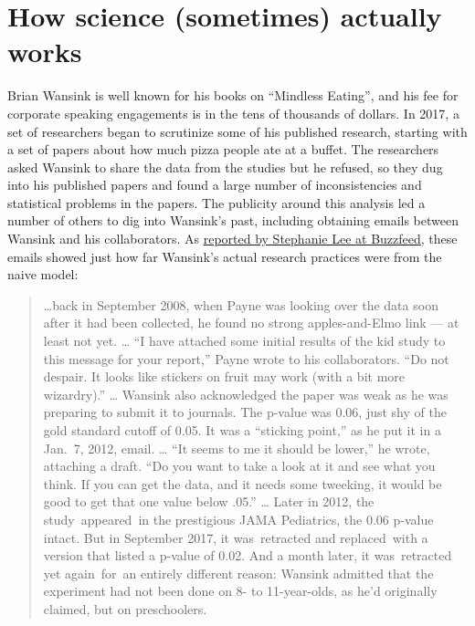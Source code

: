 \documentclass[12pt,]{book}
\theoremstyle{definition}
\theoremstyle{definition}
\theoremstyle{definition}
\theoremstyle{remark}
\begin{document}
\hypertarget{how-science-sometimes-actually-works}{%
\section{How science (sometimes) actually works}\label{how-science-sometimes-actually-works}}

Brian Wansink is well known for his books on ``Mindless Eating'', and his fee for corporate speaking engagements is in the tens of thousands of dollars. In 2017, a set of researchers began to scrutinize some of his published research, starting with a set of papers about how much pizza people ate at a buffet. The researchers asked Wansink to share the data from the studies but he refused, so they dug into his published papers and found a large number of inconsistencies and statistical problems in the papers. The publicity around this analysis led a number of others to dig into Wansink's past, including obtaining emails between Wansink and his collaborators. As \href{https://www.buzzfeednews.com/article/stephaniemlee/brian-wansink-cornell-p-hacking}{reported by Stephanie Lee at Buzzfeed}, these emails showed just how far Wansink's actual research practices were from the naive model:

\begin{quote}
\ldots{}back in September 2008, when Payne was looking over the data soon after it had been collected, he found no strong apples-and-Elmo link --- at least not yet. \ldots{}
``I have attached some initial results of the kid study to this message for your report,'' Payne wrote to his collaborators. ``Do not despair. It looks like stickers on fruit may work (with a bit more wizardry).'' \ldots{}
Wansink also acknowledged the paper was weak as he was preparing to submit it to journals. The p-value was 0.06, just shy of the gold standard cutoff of 0.05. It was a ``sticking point,'' as he put it in a Jan.~7, 2012, email. \ldots{}
``It seems to me it should be lower,'' he wrote, attaching a draft. ``Do you want to take a look at it and see what you think. If you can get the data, and it needs some tweeking, it would be good to get that one value below .05.'' \ldots{}
Later in 2012, the study~appeared~in the prestigious JAMA Pediatrics, the 0.06 p-value intact. But in September 2017, it was~retracted and replaced~with a version that listed a p-value of 0.02. And a month later, it was~retracted yet again~for~an entirely different reason: Wansink admitted that the experiment had not been done on 8- to 11-year-olds, as he'd originally claimed, but on preschoolers.
\end{quote}
\end{document}
